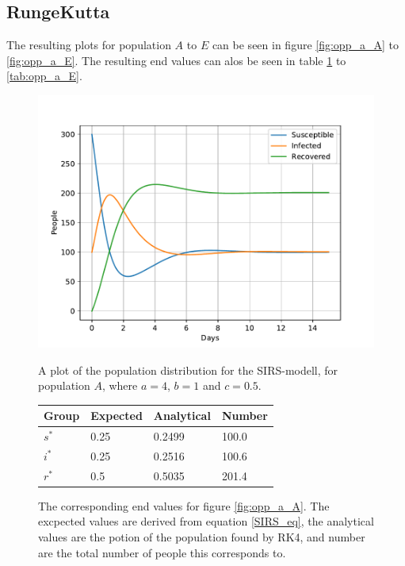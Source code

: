 \documentclass[a4paper]{article}
\let\Oldsubsection\subsection
\renewcommand{\subsection}{\FloatBarrier\Oldsubsection}
\begin{document}
\subsection{RungeKutta}

The resulting plots for population $A$ to $E$ can be seen in figure \ref{fig:opp_a_A} to \ref{fig:opp_a_E}. The resulting end values can alos be seen in table \ref{tab:opp_a_A} to \ref{tab:opp_a_E}.

\begin{figure}
	\centering
	\begin{minipage}{0.49\textwidth}
		\centering
		\includegraphics[scale=0.6]{../plots/opp_a_A.pdf}
		\caption{A plot of the population distribution for the SIRS-modell, for population $A$, where $a=4$, $b=1$ and $c=0.5$. }\label{fig:opp_a_A}
	\end{minipage}
	\begin{minipage}{0.49\textwidth}
		\centering
		\captionsetup{type=table} %
		\begin{tabular}{|l|l|l|l|}
			\hline
			Group & Expected & Analytical   & Number  \\ \hline
			$s^*$ & 0.25 & 0.2499 & 100.0 \\ \hline
			$i^*$ & 0.25 & 0.2516 & 100.6 \\ \hline
			$r^*$ & 0.5  & 0.5035 & 201.4 \\ \hline
		\end{tabular}
		\caption{The corresponding end values for figure \ref{fig:opp_a_A}. The excpected values are derived from equation \ref{SIRS_eq}, the analytical values are the potion of the population found by RK4, and number are the total number  of people this corresponds to.}\label{tab:opp_a_A}
	\end{minipage}
\end{figure}
\end{document}
